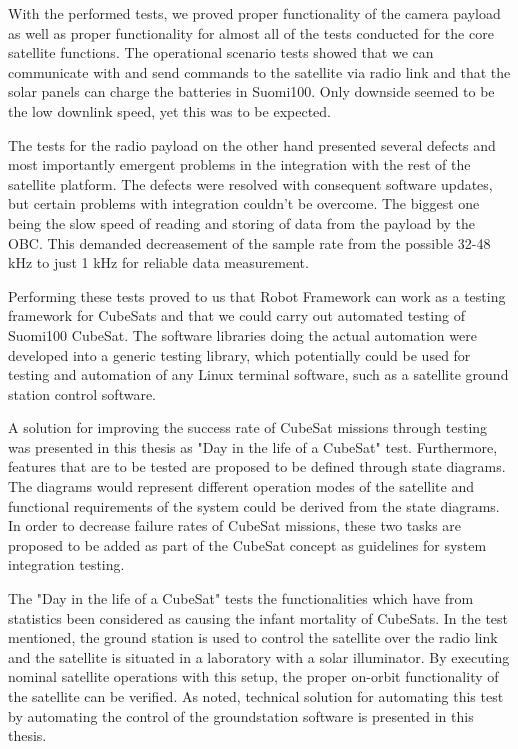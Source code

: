 \documentclass[english,12pt,a4paper,pdftex,elec,utf8]{aaltothesis}
\begin{document}
With the performed tests, we proved proper functionality of the camera payload as well as proper functionality for almost all of the tests conducted for the core satellite functions.   The operational scenario tests showed that we can communicate with and send commands to the satellite via radio link and that the solar panels can charge the batteries in Suomi100. Only downside seemed to be the low downlink speed, yet this was to be expected.\par 
The tests for the radio payload on the other hand presented several defects and most importantly emergent problems in the integration with the rest of the satellite platform. The defects were resolved with consequent software updates, but certain problems with integration couldn't be overcome. The biggest one being the slow speed of reading and storing of data from the payload by the OBC. This demanded decreasement of the sample rate from the possible 32-48 kHz to just 1 kHz for reliable data measurement.\par  
Performing these tests proved to us that Robot Framework can work as a testing framework for CubeSats and that we could carry out automated testing of Suomi100 CubeSat. The software libraries doing the actual automation were developed into a generic testing library, which potentially could be used for testing and automation of any Linux terminal software, such as a satellite ground station control software.\par 
A solution for improving the success rate of CubeSat missions through testing was presented in this thesis as "Day in the life of a CubeSat" test. Furthermore, features that are to be tested are proposed to be defined through state diagrams. The diagrams would represent different operation modes of the satellite and functional requirements of the system could be derived from the state diagrams. In order to decrease failure rates of CubeSat missions, these two tasks are proposed to be added as part of the CubeSat concept as guidelines for system integration testing. \par 
The "Day in the life of a CubeSat" tests the functionalities which have from statistics been considered as causing the infant mortality of CubeSats. In the test mentioned, the ground station is used to control the satellite over the radio link and the satellite is situated in a laboratory with a solar illuminator. By executing nominal satellite operations with this setup, the proper on-orbit functionality of the satellite can be verified. As noted, technical solution for automating this test by automating the control of the groundstation software is presented in this thesis.
\end{document}
